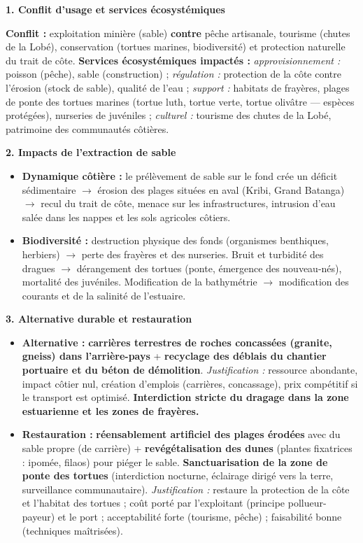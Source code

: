 \documentclass[11pt]{article}
\begin{document}
\begin{corrige}
\textbf{1. Conflit d'usage et services écosystémiques}\par
\textbf{Conflit :} exploitation minière (sable) \textbf{contre} pêche artisanale, tourisme (chutes de la Lobé), conservation (tortues marines, biodiversité) et protection naturelle du trait de côte.
\textbf{Services écosystémiques impactés :} \textit{approvisionnement :} poisson (pêche), sable (construction) ; \textit{régulation :} protection de la côte contre l'érosion (stock de sable), qualité de l'eau ; \textit{support :} habitats de frayères, plages de ponte des tortues marines (tortue luth, tortue verte, tortue olivâtre — espèces protégées), nurseries de juvéniles ; \textit{culturel :} tourisme des chutes de la Lobé, patrimoine des communautés côtières.

\textbf{2. Impacts de l'extraction de sable}\par
\begin{itemize}
    \item \textbf{Dynamique côtière :} le prélèvement de sable sur le fond crée un déficit sédimentaire $\rightarrow$ érosion des plages situées en aval (Kribi, Grand Batanga) $\rightarrow$ recul du trait de côte, menace sur les infrastructures, intrusion d'eau salée dans les nappes et les sols agricoles côtiers.
    \item \textbf{Biodiversité :} destruction physique des fonds (organismes benthiques, herbiers) $\rightarrow$ perte des frayères et des nurseries. Bruit et turbidité des dragues $\rightarrow$ dérangement des tortues (ponte, émergence des nouveau-nés), mortalité des juvéniles. Modification de la bathymétrie $\rightarrow$ modification des courants et de la salinité de l'estuaire.
\end{itemize}

\textbf{3. Alternative durable et restauration}\par
\begin{itemize}
    \item \textbf{Alternative :} \textbf{carrières terrestres de roches concassées (granite, gneiss) dans l'arrière-pays} + \textbf{recyclage des déblais du chantier portuaire et du béton de démolition}. \textit{Justification :} ressource abondante, impact côtier nul, création d'emplois (carrières, concassage), prix compétitif si le transport est optimisé. \textbf{Interdiction stricte du dragage dans la zone estuarienne et les zones de frayères.}
    \item \textbf{Restauration :} \textbf{réensablement artificiel des plages érodées} avec du sable propre (de carrière) + \textbf{revégétalisation des dunes} (plantes fixatrices : ipomée, filaos) pour piéger le sable. \textbf{Sanctuarisation de la zone de ponte des tortues} (interdiction nocturne, éclairage dirigé vers la terre, surveillance communautaire). \textit{Justification :} restaure la protection de la côte et l'habitat des tortues ; coût porté par l'exploitant (principe pollueur-payeur) et le port ; acceptabilité forte (tourisme, pêche) ; faisabilité bonne (techniques maîtrisées).
\end{itemize}
\end{corrige}
\end{document}
